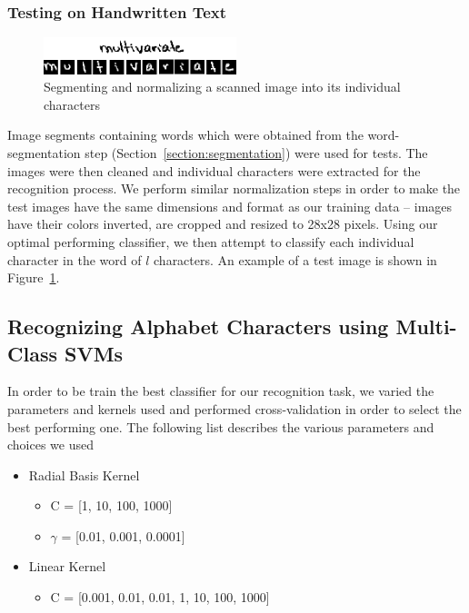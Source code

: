\documentclass[12pt]{article}
\begin{document}
	\subsubsection{Testing on Handwritten Text}
		
		\begin{figure}[htbp!]
		\centering
		\includegraphics[width=0.5\textwidth]{multivariate_test.eps}
		\caption{Segmenting and normalizing a scanned image into its individual characters}
		\label{figure:multivariate_test}
		\end{figure}
		
		Image segments containing words which were obtained from the word-segmentation step (Section~\ref{section:segmentation}) were used for tests. The images were then cleaned and individual characters were extracted for the recognition process. We perform similar normalization steps in order to make the test images have the same dimensions and format as our training data -- images have their colors inverted, are cropped and resized to 28x28 pixels. Using our optimal performing classifier, we then attempt to classify each individual character in the word of $l$ characters. An example of a test image is shown in Figure~\ref{figure:multivariate_test}.
	
	\subsection{Recognizing Alphabet Characters using Multi-Class SVMs}
	\label{subsection:experiments:svm}

		In order to be train the best classifier for our recognition task, we varied the parameters and kernels used and performed cross-validation in order to select the best performing one. The following list describes the various parameters and choices we used

		\begin{itemize}
			\item Radial Basis Kernel
			\begin{itemize}
				\item C = [1, 10, 100, 1000]
				\item $\gamma$ = [0.01, 0.001, 0.0001]
			\end{itemize}
			\item Linear Kernel
			\begin{itemize}
				\item C = [0.001, 0.01, 0.01, 1, 10, 100, 1000]
			\end{itemize}
		\end{itemize}
		
\end{document}
